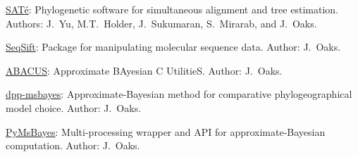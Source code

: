 \myHangIndent
\href{http://phylo.bio.ku.edu/software/sate/sate.html}{{SAT}\'{e}}:
    Phylogenetic software for simultaneous alignment and tree estimation.
Authors: J.\ Yu, M.T.\ Holder, J.\ Sukumaran, S.\ Mirarab, and J.\ Oaks.

\myHangIndent
\href{https://github.com/joaks1/SeqSift}{SeqSift}:
    Package for manipulating molecular sequence data.
Author: J.\ Oaks.

\myHangIndent
\href{https://github.com/joaks1/abacus}{ABACUS}:
    Approximate BAyesian C UtilitieS.
Author: J.\ Oaks.

\myHangIndent
\href{https://github.com/joaks1/dpp-msbayes}{dpp-msbayes}:
    Approximate-Bayesian method for comparative phylogeographical model choice.
Author: J.\ Oaks.

\myHangIndent
\href{https://github.com/joaks1/PyMsBayes}{PyMsBayes}:
    Multi-processing wrapper and API for approximate-Bayesian
    computation.
Author: J.\ Oaks.

